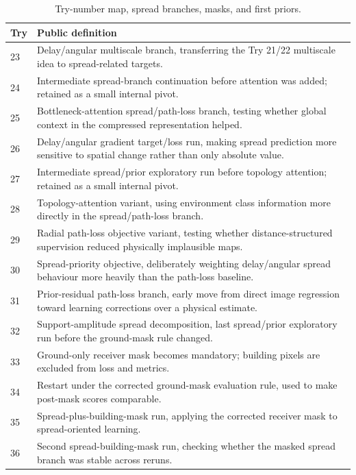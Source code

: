 \begin{table}[H]
\centering
\caption{Try-number map, spread branches, masks, and first priors.}
\label{tab:try_map_masks_priors}
\tiny
\renewcommand{\arraystretch}{0.78}
\setlength{\tabcolsep}{2pt}
\begin{tabularx}{\textwidth}{p{}>{\raggedright\arraybackslash}X}
\toprule
Try & Public definition \\
\midrule
23 & Delay/angular multiscale branch, transferring the Try 21/22 multiscale idea to spread-related targets. \\
24 & Intermediate spread-branch continuation before attention was added; retained as a small internal pivot. \\
25 & Bottleneck-attention spread/path-loss branch, testing whether global context in the compressed representation helped. \\
26 & Delay/angular gradient target/loss run, making spread prediction more sensitive to spatial change rather than only absolute value. \\
27 & Intermediate spread/prior exploratory run before topology attention; retained as a small internal pivot. \\
28 & Topology-attention variant, using environment class information more directly in the spread/path-loss branch. \\
29 & Radial path-loss objective variant, testing whether distance-structured supervision reduced physically implausible maps. \\
30 & Spread-priority objective, deliberately weighting delay/angular spread behaviour more heavily than the path-loss baseline. \\
31 & Prior-residual path-loss branch, early move from direct image regression toward learning corrections over a physical estimate. \\
32 & Support-amplitude spread decomposition, last spread/prior exploratory run before the ground-mask rule changed. \\
33 & Ground-only receiver mask becomes mandatory; building pixels are excluded from loss and metrics. \\
34 & Restart under the corrected ground-mask evaluation rule, used to make post-mask scores comparable. \\
35 & Spread-plus-building-mask run, applying the corrected receiver mask to spread-oriented learning. \\
36 & Second spread-building-mask run, checking whether the masked spread branch was stable across reruns. \\

\end{tabularx}
\end{table}
